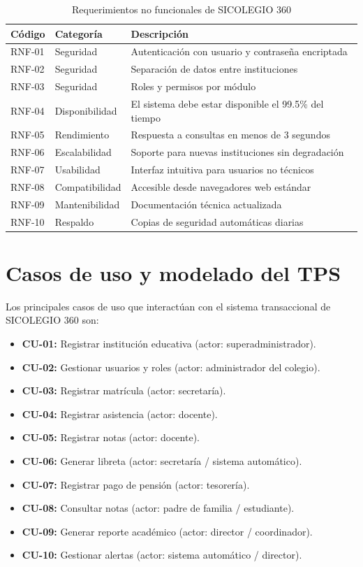 \documentclass[12pt,a4paper,oneside]{report}
\begin{document}
\begin{table}[H]
\centering
\caption{Requerimientos no funcionales de SICOLEGIO 360}
\label{tab:req_nofunc}
\begin{tabularx}{\textwidth}{llX}
\toprule
Código & Categoría & Descripción \\
\midrule
RNF-01 & Seguridad & Autenticación con usuario y contraseña encriptada \\
RNF-02 & Seguridad & Separación de datos entre instituciones \\
RNF-03 & Seguridad & Roles y permisos por módulo \\
RNF-04 & Disponibilidad & El sistema debe estar disponible el 99.5\% del tiempo \\
RNF-05 & Rendimiento & Respuesta a consultas en menos de 3 segundos \\
RNF-06 & Escalabilidad & Soporte para nuevas instituciones sin degradación \\
RNF-07 & Usabilidad & Interfaz intuitiva para usuarios no técnicos \\
RNF-08 & Compatibilidad & Accesible desde navegadores web estándar \\
RNF-09 & Mantenibilidad & Documentación técnica actualizada \\
RNF-10 & Respaldo & Copias de seguridad automáticas diarias \\
\bottomrule
\end{tabularx}
\end{table}

\section{Casos de uso y modelado del TPS}

Los principales casos de uso que interactúan con el sistema transaccional de SICOLEGIO 360 son:
\begin{itemize}
  \item \textbf{CU-01:} Registrar institución educativa (actor: superadministrador).
  \item \textbf{CU-02:} Gestionar usuarios y roles (actor: administrador del colegio).
  \item \textbf{CU-03:} Registrar matrícula (actor: secretaría).
  \item \textbf{CU-04:} Registrar asistencia (actor: docente).
  \item \textbf{CU-05:} Registrar notas (actor: docente).
  \item \textbf{CU-06:} Generar libreta (actor: secretaría / sistema automático).
  \item \textbf{CU-07:} Registrar pago de pensión (actor: tesorería).
  \item \textbf{CU-08:} Consultar notas (actor: padre de familia / estudiante).
  \item \textbf{CU-09:} Generar reporte académico (actor: director / coordinador).
  \item \textbf{CU-10:} Gestionar alertas (actor: sistema automático / director).
\end{itemize}
\end{document}
